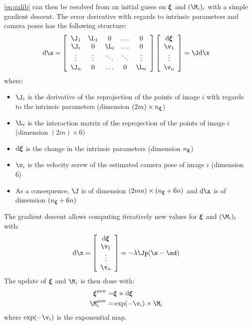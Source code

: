 \documentclass{ecnreport}
\begin{document}
\eqref{eq:calib} can then be resolved from an initial guess on ${\boldsymbol{\xi}}$ and $(\M_i)_i$ with a simple gradient descent. 
The error derivative with regards to intrinsic parameters and camera poses has the following structure:
\newcommand{\der}{\text{d}}
\begin{equation}\label{eq:jacob}
 \der\s =  \left[\begin{array}{ccccc}
           \J_1 & \L_1 &  0 &  \hdots & 0 \\ 
           \J_i & 0 & \L_i &  \hdots & 0 \\
           \vdots& \vdots & \ddots & \ddots & \vdots\\
           \J_n & 0 & \hdots & 0 & \L_n
            \end{array}\right]
            \left[\begin{array}{c}\der\xii \\ \v_1 \\ \vdots \\ \v_n\end{array}\right]
             = \J\der\x
\end{equation}
where:
\begin{itemize}
\item $\J_i$ is the derivative of the reprojection of the points of image $i$ with regards to the intrinsic parameters (dimension $(2m)\times n_{\boldsymbol{\xi}}$)
 \item $\L_i$ is the interaction matrix of the reprojection of the points of image $i$ (dimension $(2m)\times 6$)
 \item $\der\xii$ is the change in the intrinsic parameters (dimension $n_{\boldsymbol{\xi}}$) 
 \item $\v_i$ is the velocity screw of the estimated camera pose of image $i$ (dimension $6$)
 \item As a consequence, $\J$ is of dimension $(2mn)\times (n_{\boldsymbol{\xi}}+6n)$ and $\der\x$ is of dimension  $(n_{\boldsymbol{\xi}}+6n)$
\end{itemize}
The gradient descent allows computing iteratively new values for ${\boldsymbol{\xi}}$ and $(\M_i)_i$ with:
\begin{equation}
 \der\x = \left[\begin{array}{c}\der\xii \\ \v_1 \\ \vdots \\ \v_n\end{array}\right] = -\lambda\Jp(\s - \sd)
\end{equation}
The update of ${\boldsymbol{\xi}}$ and $\M_i$ is then done with:
\begin{eqnarray}
 \xii^{\text{new}} =& \xii + \der\xii \label{upd:xi}\\
 \M_i^{\text{new}} =& \exp(-\v_i)\times\M_i \label{upd:M}
\end{eqnarray}
where $\exp(-\v_i)$ is the exponential map.\\
\end{document}
